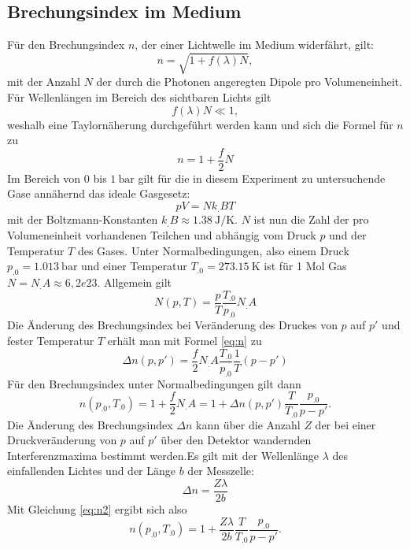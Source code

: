 \subsection{Brechungsindex im Medium}
Für den Brechungsindex $n$, der einer Lichtwelle im Medium widerfährt, gilt:
\begin{equation*}
n= \sqrt{1+f(\lambda)N},
\end{equation*}
mit der Anzahl $N$ der durch die Photonen angeregten Dipole pro Volumeneinheit.\newline
Für Wellenlängen im Bereich des sichtbaren Lichts gilt
\[
f(\lambda)N\ll 1,
\]
weshalb eine Taylornäherung durchgeführt werden kann und sich die Formel für $n$ zu 
\begin{equation}
n= 1+\frac{f}{2}N\label{eq:n}
\end{equation}
Im Bereich von $0$ bis $\SI{1}{\bar}$ gilt für die in diesem Experiment zu untersuchende Gase annähernd das ideale Gasgesetz:
\[
pV=Nk_.BT
\]
mit der Boltzmann-Konstanten $k_.B\approx\SI{1,38}{\joule\per\kelvin}$.
$N$ ist nun die Zahl der pro Volumeneinheit vorhandenen Teilchen und abhängig vom Druck $p$ und der Temperatur $T$ des Gases.
Unter Normalbedingungen, also einem Druck $p_.0=\SI{1,013}{\bar}$ und einer Temperatur $T_.0=\SI{273,15}{\kelvin}$ ist für 1 Mol Gas $N=N_.A\approx 6,2e23$.\newline
Allgemein gilt
\[
N(p,T)=\frac{p}{T}\frac{T_.0}{p_.0}N_.A
\]
Die Änderung des Brechungsindex bei Veränderung des Druckes von $p$ auf $p'$ und fester Temperatur $T$ erhält man mit Formel \eqref{eq:n} zu
\begin{equation}
\Delta n(p,p')=\frac{f}{2}N_.A\frac{T_.0}{p_.0}\frac{1}{T}(p-p')\label{eq:dn}
\end{equation}
Für den Brechungsindex unter Normalbedingungen gilt dann 
\begin{equation}
n(p_.0,T_.0)=1+\frac{f}{2}N_.A=1+\Delta n(p,p')\frac{T}{T_.0}\frac{p_.0}{p-p'}\text{.}\label{eq:n2}
\end{equation} 
Die Änderung des Brechungsindex $\Delta n$ kann über die Anzahl $Z$ der bei einer Druckveränderung von $p$ auf $p'$ über den Detektor wandernden Interferenzmaxima bestimmt werden.\newline Es gilt mit der Wellenlänge $\lambda$ des einfallenden Lichtes und der Länge $b$ der Messzelle:
\begin{equation}
\Delta n = \frac{Z\lambda}{2b}
\end{equation}
Mit Gleichung \eqref{eq:n2} ergibt sich also
\begin{equation}
n(p_.0,T_.0)=1+\frac{Z\lambda}{2b}\frac{T}{T_.0}\frac{p_.0}{p-p'}\text{.}\label{eq:n3}
\end{equation}
